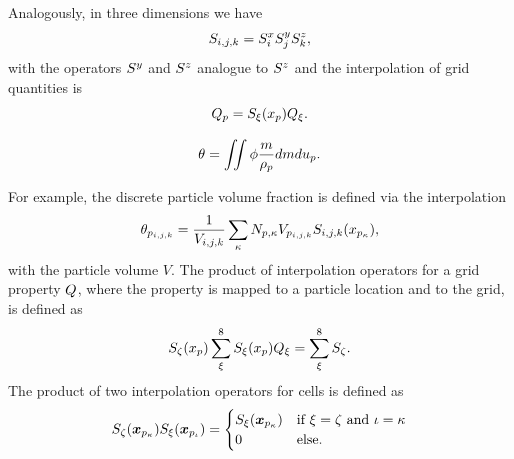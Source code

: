 Analogously, in three dimensions we have
\begin{equation*}
    S_{i,j,k} = S^x_i S^y_j S^z_k,
\end{equation*}
with the operators $S^y$ and $S^z$ analogue to $S^z$ and the interpolation of grid quantities is
\begin{equation*}
    Q_p = S_\xi ( x_p) Q_\xi.
\end{equation*}

\begin{equation}
    \label{eq:svf}
    \pvf = \MultiIntegral{2} \pd \dfrac{\m}{\rp} d \m d \up.
\end{equation}

For example, the discrete particle volume fraction is defined via the interpolation
\begin{equation*}
    \theta_{p_{i,j,k}} = \dfrac{1}{V_{i,j,k}} \sum_{\kappa } N_{p,\kappa} V_{p_{i,j,k}} S_{i,j,k} (x_{p_\kappa}),
\end{equation*}
with the particle volume $V$.
The product of interpolation operators for a grid property $Q$, where the property is mapped to a particle location and to the grid, is defined as
\begin{equation*}
    S_\zeta (x_p) \sum_{\xi}^8 S_\xi (x_p) Q_\xi = \sum_{\xi}^{8} S_\zeta.
\end{equation*}
The product of two interpolation operators for cells is defined as
\begin{equation}
\label{eq:ipOrtho}
    S_\zeta(\boldsymbol{x}_{p_{\kappa}})S_{\xi} (\boldsymbol{x}_{p_\iota}) = \begin{cases}
        S_{\xi}(\boldsymbol{x}_{p_\kappa}) & \text{if } \xi = \zeta \text{ and } \iota = \kappa \\
        0 & \text{else}.
    \end{cases}
\end{equation} 

